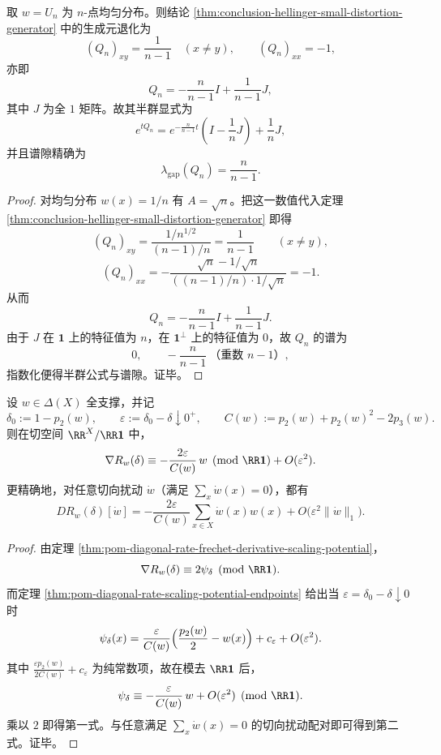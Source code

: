 \begin{corollary}[均匀字母表上的完全图极限半群]\label{cor:conclusion-uniform-complete-graph-generator}
取 \(w=U_n\) 为 \(n\)-点均匀分布。则结论 \ref{thm:conclusion-hellinger-small-distortion-generator} 中的生成元退化为
\[
(Q_n)_{xy}=\frac1{n-1}\quad(x\ne y),
\qquad
(Q_n)_{xx}=-1,
\]
亦即
\[
Q_n=-\frac{n}{n-1}I+\frac1{n-1}J,
\]
其中 \(J\) 为全 \(1\) 矩阵。故其半群显式为
\[
e^{tQ_n}
=
e^{-\frac{n}{n-1}t}\left(I-\frac1nJ\right)+\frac1nJ,
\]
并且谱隙精确为
\[
\lambda_{\mathrm{gap}}(Q_n)=\frac{n}{n-1}.
\]
\end{corollary}
\begin{proof}
对均匀分布 \(w(x)=1/n\) 有 \(A=\sqrt n\)。把这一数值代入定理 \ref{thm:conclusion-hellinger-small-distortion-generator} 即得
\[
(Q_n)_{xy}=\frac{1/n^{1/2}}{(n-1)/n}=\frac1{n-1}\qquad(x\ne y),
\]
\[
(Q_n)_{xx}
=-\frac{\sqrt n-1/\sqrt n}{((n-1)/n)\cdot 1/\sqrt n}
=-1.
\]
从而
\[
Q_n=-\frac{n}{n-1}I+\frac1{n-1}J.
\]
由于 \(J\) 在 \(\mathbf 1\) 上的特征值为 \(n\)，在 \(\mathbf 1^\perp\) 上的特征值为 \(0\)，故 \(Q_n\) 的谱为
\[
0,\qquad -\frac{n}{n-1}\ \text{（重数 }n-1\text{）},
\]
指数化便得半群公式与谱隙。证毕。
\end{proof}

\begin{theorem}[零速率端点的一阶切向塌缩]\label{thm:conclusion-zero-rate-endpoint-rankone-tangent-collapse}
设 \(w\in\Delta(X)\) 全支撑，并记
\[
\delta_0:=1-p_2(w),
\qquad
\varepsilon:=\delta_0-\delta\downarrow 0^+,
\qquad
C(w):=p_2(w)+p_2(w)^2-2p_3(w).
\]
则在切空间 \(\RR^X/\RR\mathbf 1\) 中，
\[
\nabla R_w(\delta)
\equiv
-\frac{2\varepsilon}{C(w)}\,w
\pmod{\RR\mathbf 1}
+O(\varepsilon^2).
\]
更精确地，对任意切向扰动 \(\dot w\)（满足 \(\sum_x \dot w(x)=0\)），都有
\[
DR_w(\delta)[\dot w]
=
-\frac{2\varepsilon}{C(w)}
\sum_{x\in X}\dot w(x)w(x)
+O\!\bigl(\varepsilon^2\|\dot w\|_1\bigr).
\]
\end{theorem}
\begin{proof}
由定理 \ref{thm:pom-diagonal-rate-frechet-derivative-scaling-potential}，
\[
\nabla R_w(\delta)\equiv 2\psi_\delta \pmod{\RR\mathbf 1}.
\]
而定理 \ref{thm:pom-diagonal-rate-scaling-potential-endpoints} 给出当 \(\varepsilon=\delta_0-\delta\downarrow 0\) 时
\[
\psi_\delta(x)=\frac{\varepsilon}{C(w)}\Bigl(\frac{p_2(w)}{2}-w(x)\Bigr)+c_\varepsilon+O(\varepsilon^2).
\]
其中 \(\frac{\varepsilon p_2(w)}{2C(w)}+c_\varepsilon\) 为纯常数项，故在模去 \(\RR\mathbf 1\) 后，
\[
\psi_\delta\equiv -\frac{\varepsilon}{C(w)}\,w+O(\varepsilon^2)\pmod{\RR\mathbf 1}.
\]
乘以 \(2\) 即得第一式。与任意满足 \(\sum_x\dot w(x)=0\) 的切向扰动配对即可得到第二式。证毕。
\end{proof}

